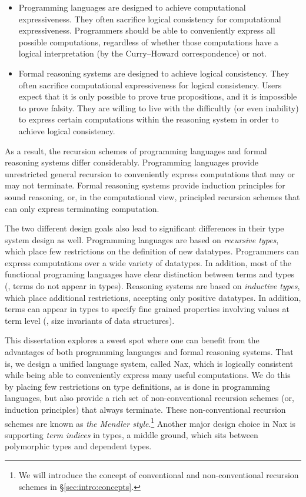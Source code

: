 \begin{itemize}

\item
Programming languages are designed to achieve computational expressiveness.
They often sacrifice logical consistency for computational expressiveness.
Programmers should be able to conveniently express all possible computations,
regardless of whether those computations have a logical interpretation
(by the Curry--Howard correspondence) or not.

\item
Formal reasoning systems are designed to achieve logical consistency.
They often sacrifice computational expressiveness for logical consistency.
Users expect that it is only possible to prove true propositions,
and it is impossible to prove falsity. They are willing to live with
the difficultly (or even inability) to express certain computations
within the reasoning system in order to achieve logical consistency.

\end{itemize}

As a result, the recursion schemes of programming languages and
formal reasoning systems differ considerably.
Programming languages provide unrestricted general recursion
to conveniently express computations that may or may not terminate.
Formal reasoning systems provide induction principles for sound reasoning,
or, in the computational view, principled recursion schemes that can only
express terminating computation.

The two different design goals also lead to significant differences
in their type system design as well. Programming languages are based on
\emph{recursive types}, which place few restrictions on the definition of
new datatypes. Programmers can express computations over a wide variety of
datatypes. In addition, most of the functional programing languages have
clear distinction between terms and types (\ie, terms do not appear in types).
Reasoning systems are based on \emph{inductive types}, which place additional
restrictions, accepting only positive datatypes. In addition, terms can appear
in types to specify fine grained properties involving values at term level
(\eg, size invariants of data structures).

This dissertation explores a sweet spot where one can benefit from
the advantages of both programming languages and formal reasoning systems.
That is, we design a unified language system, called Nax, which is
logically consistent while being able to conveniently express
many useful computations. We do this by placing few restrictions
on type definitions, as is done in programming languages, but also
provide a rich set of non-conventional recursion schemes
(or, induction principles) that always terminate.
These non-conventional recursion schemes are known as
\emph{the Mendler style}.\footnote{We will introduce
	the concept of conventional and non-conventional recursion schemes
	in \S\ref{sec:intro:concepts}.}
Another major design choice in Nax is supporting \emph{term indices} in types,
a middle ground, which sits between polymorphic types and dependent types.

